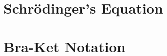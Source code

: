 \documentclass[a4paper, titlepage]{book}
\begin{document}
\frontmatter


\tableofcontents


\mainmatter


\chapter{Schrödinger's Equation}


\appendix


\chapter{Bra-Ket Notation}


\backmatter
\printbibliography[title={References}]
\end{document}
